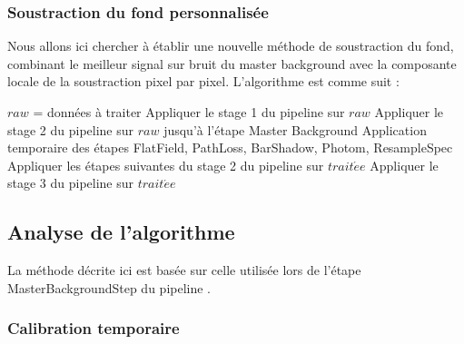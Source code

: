 \documentclass[11pt, a4paper]{article}
\begin{document}
  \subsubsection{Soustraction du fond personnalisée}

  Nous allons ici chercher à établir une nouvelle méthode de soustraction du fond, combinant le meilleur signal sur bruit du master background avec la composante locale de la soustraction pixel par pixel. L'algorithme est comme suit :\\

  \begin{algorithm}[H]
    $raw$ = données à traiter \;
    Appliquer le stage 1 du pipeline sur $raw$ \;
    Appliquer le stage 2 du pipeline sur $raw$ jusqu'à l'étape Master Background \;
    Application temporaire des étapes FlatField, PathLoss, BarShadow, Photom, ResampleSpec \;
    Appliquer les étapes suivantes du stage 2 du pipeline sur $trait\acute{e}e$\;
    Appliquer le stage 3 du pipeline sur $trait\acute{e}e$\;
  \end{algorithm}

\subsection{Analyse de l'algorithme}

La méthode décrite ici est basée sur celle utilisée lors de l'étape MasterBackgroundStep du pipeline \cite{mos_master_background}.

\subsubsection{Calibration temporaire}
\end{document}
